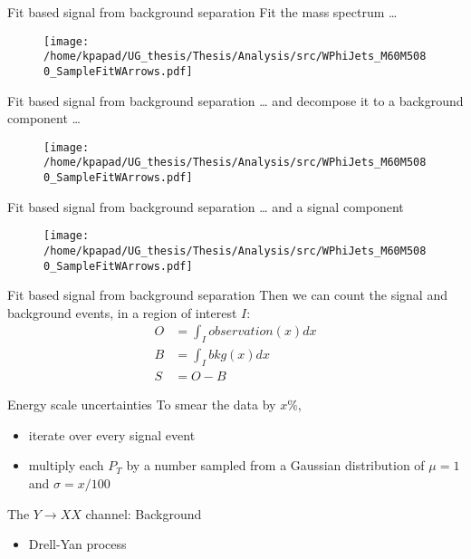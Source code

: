 \documentclass[bigger]{beamer}
\begin{document}
\begin{frame}[label={sec:orge5cd412}]{Fit based signal from background separation}
Fit the mass spectrum \ldots{}
\begin{figure}[hb]
\centering
\texttt{[image: /home/kpapad/UG\_thesis/Thesis/Analysis/src/WPhiJets\_M60M5080\_SampleFitWArrows.pdf]}
\end{figure}
\end{frame}
\begin{frame}[label={sec:org2ffbfc9}]{Fit based signal from background separation}
\ldots{} and decompose it to a background component \ldots{}
\begin{figure}[hb]
\centering
\texttt{[image: /home/kpapad/UG\_thesis/Thesis/Analysis/src/WPhiJets\_M60M5080\_SampleFitWArrows.pdf]}
\end{figure}
\end{frame}
\begin{frame}[label={sec:org4c7a6f9}]{Fit based signal from background separation}
\ldots{} and a signal component
\begin{figure}[hb]
\centering
\texttt{[image: /home/kpapad/UG\_thesis/Thesis/Analysis/src/WPhiJets\_M60M5080\_SampleFitWArrows.pdf]}
\end{figure}
\end{frame}
\begin{frame}[label={sec:org178ba9f}]{Fit based signal from background separation}
Then we can count the signal and background events, in a region of interest \(I\):
\begin{align}
O &= \int_{I} observation(x) dx \\
B &= \int_{I} bkg(x) dx\\
S &= O - B
\end{align}
\end{frame}

\begin{frame}[label={sec:org55fbc53}]{Energy scale uncertainties}
To smear the data by \(x\%\),
\begin{itemize}
\item iterate over every signal event
\item multiply each \(P_{T}\) by a number sampled from a Gaussian distribution of \(\mu = 1\) and \(\sigma = x/100\)
\end{itemize}
\end{frame}
\begin{frame}[label={sec:orgf3980cb}]{The \(Y \rightarrow XX\) channel: Background}
\begin{itemize}
\item Drell-Yan process
\end{itemize}
\end{frame}
\end{document}
